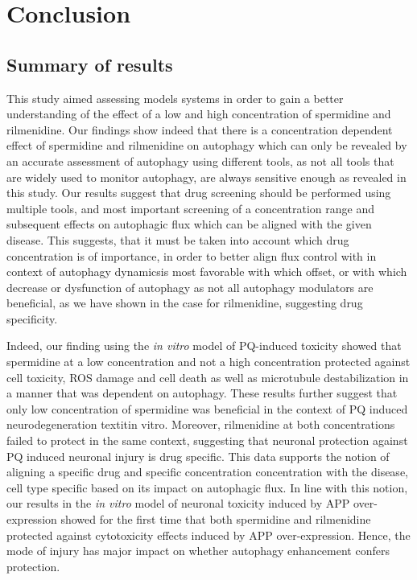 \chapter{Conclusion}
\section{Summary of results}
This study aimed assessing models systems in order to gain a better understanding of the effect of a low and high concentration of spermidine and rilmenidine.
Our findings show indeed that  there is a concentration dependent effect of spermidine and rilmenidine on autophagy which can only be revealed by an accurate assessment of autophagy using different tools, as not all tools that are widely used to monitor autophagy, are always sensitive enough as revealed in this study. Our results suggest that drug screening should be performed using multiple tools, and most important screening of a concentration range and subsequent effects on autophagic flux which can be aligned with the given disease. This suggests, that it must be taken into account which drug concentration is of importance, in order to better align flux control with in context of autophagy dynamicsis most favorable with which offset, or with which decrease or dysfunction of autophagy as not all autophagy modulators are beneficial, as we have shown in the case for rilmenidine, suggesting drug specificity. 

Indeed, our finding using the \textit{in vitro} model of PQ-induced toxicity showed that spermidine at a low concentration and not a high concentration protected against cell toxicity, ROS damage and cell death as well as microtubule destabilization in a manner that was dependent on autophagy. These results further suggest that only low concentration of spermidine was beneficial in the context of PQ induced neurodegeneration textit{in vitro}. Moreover, rilmenidine at both concentrations failed to protect in the same context, suggesting that neuronal protection against PQ induced neuronal injury is drug specific. This data supports the notion of  aligning a specific drug and specific concentration concentration with the disease, cell type specific based on its impact on autophagic flux. In line with this notion, our results in the \textit{in vitro} model of neuronal toxicity induced by APP over-expression showed for the first time that both spermidine and rilmenidine protected against cytotoxicity effects induced by APP over-expression. Hence, the mode of injury has major impact on whether autophagy enhancement  confers protection. 

